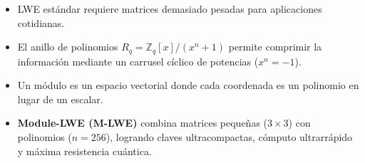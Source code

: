 \begin{resumencapitulo}
\begin{itemize}
  \item LWE estándar requiere matrices demasiado pesadas para aplicaciones cotidianas.
  \item El anillo de polinomios $R_q = \mathbb{Z}_q[x]/(x^n+1)$ permite comprimir la información mediante un carrusel cíclico de potencias ($x^n = -1$).
  \item Un módulo es un espacio vectorial donde cada coordenada es un polinomio en lugar de un escalar.
  \item \textbf{Module-LWE (M-LWE)} combina matrices pequeñas ($3 \times 3$) con polinomios ($n=256$), logrando claves ultracompactas, cómputo ultrarrápido y máxima resistencia cuántica.
\end{itemize}
\end{resumencapitulo}

